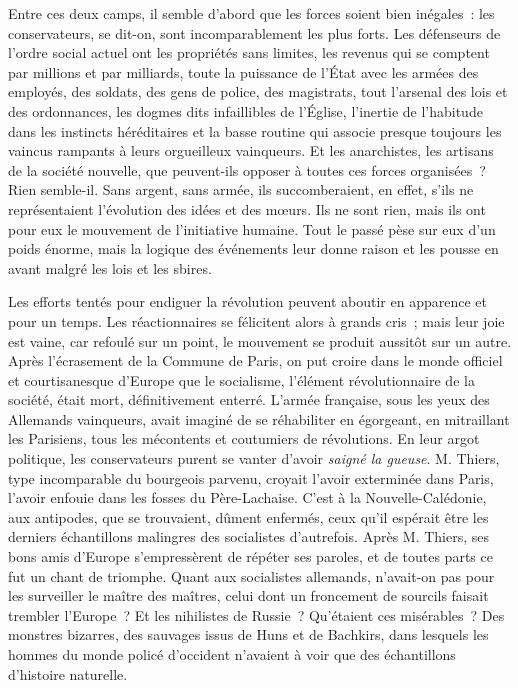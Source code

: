 \documentclass[french,twoside]{book} %
\begin{document}
Entre ces deux camps, il semble d’abord que les forces soient bien inégales : les conservateurs, se dit-on, sont incomparablement les plus forts. Les défenseurs de l’ordre social actuel ont les propriétés sans limites, les revenus qui se comptent par millions et par milliards, toute la puissance de l’État avec les armées des employés, des soldats, des gens de police, des magistrats, tout l’arsenal des lois et des ordonnances,  les dogmes dits infaillibles de l’Église, l’inertie de l’habitude dans les instincts héréditaires et la basse routine qui associe presque toujours les vaincus rampants à leurs orgueilleux vainqueurs. Et les anarchistes, les artisans de la société nouvelle, que peuvent-ils opposer à toutes ces forces organisées ? Rien semble-il. Sans argent, sans armée, ils succomberaient, en effet, s’ils ne représentaient l’évolution des idées et des mœurs. Ils ne sont rien, mais ils ont pour eux le mouvement de l’initiative humaine. Tout le passé pèse sur eux d’un poids énorme, mais la logique des événements leur donne raison et les pousse en avant malgré les lois et les sbires.\par
Les efforts tentés pour endiguer la révolution peuvent aboutir en apparence  et pour un temps. Les réactionnaires se félicitent alors à grands cris ; mais leur joie est vaine, car refoulé sur un point, le mouvement se produit aussitôt sur un autre. Après l’écrasement de la Commune de Paris, on put croire dans le monde officiel et courtisanesque d’Europe que le socialisme, l’élément révolutionnaire de la société, était mort, définitivement enterré. L’armée française, sous les yeux des Allemands vainqueurs, avait imaginé de se réhabiliter en égorgeant, en mitraillant les Parisiens, tous les mécontents et coutumiers de révolutions. En leur argot politique, les conservateurs purent se vanter d’avoir \emph{saigné la gueuse}. M. Thiers, type incomparable du bourgeois parvenu, croyait l’avoir exterminée dans Paris,  l’avoir enfouie dans les fosses du Père-Lachaise. C’est à la Nouvelle-Calédonie, aux antipodes, que se trouvaient, dûment enfermés, ceux qu’il espérait être les derniers échantillons malingres des socialistes d’autrefois. Après M. Thiers, ses bons amis d’Europe s’empressèrent de répéter ses paroles, et de toutes parts ce fut un chant de triomphe. Quant aux socialistes allemands, n’avait-on pas pour les surveiller le maître des maîtres, celui dont un froncement de sourcils faisait trembler l’Europe ? Et les nihilistes de Russie ? Qu’étaient ces misérables ? Des monstres bizarres, des sauvages issus de Huns et de Bachkirs, dans lesquels les hommes du monde policé d’occident n’avaient à voir que des échantillons d’histoire naturelle.\par
\end{document}
